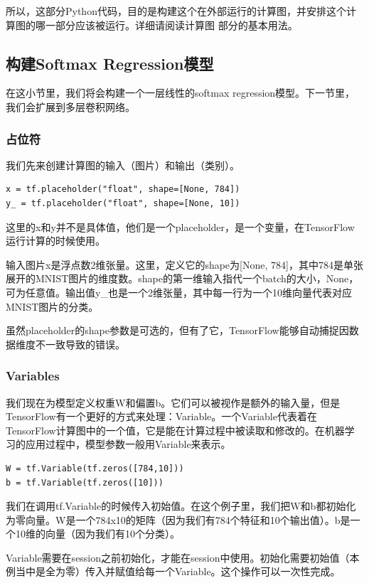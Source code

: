 \documentclass[a4paper,11pt,twoside]{ctexbook}
\begin{document}
所以，这部分Python代码，目的是构建这个在外部运行的计算图，并安排这个计算图的哪一部分应该被运行。详细请阅读计算图 部分的基本用法。 %

\subsection{构建Softmax Regression模型}

在这小节里，我们将会构建一个一层线性的softmax regression模型。下一节里，我们会扩展到多层卷积网络。

\subsubsection{占位符}
我们先来创建计算图的输入（图片）和输出（类别）。

\begin{lstlisting}
x = tf.placeholder("float", shape=[None, 784])
y_ = tf.placeholder("float", shape=[None, 10])
\end{lstlisting}

这里的x和y并不是具体值，他们是一个placeholder，是一个变量，在TensorFlow运行计算的时候使用。

输入图片x是浮点数2维张量。这里，定义它的shape为[None, 784]，其中784是单张展开的MNIST图片的维度数。shape的第一维输入指代一个batch的大小，None，可为任意值。输出值y\_也是一个2维张量，其中每一行为一个10维向量代表对应MNIST图片的分类。

虽然placeholder的shape参数是可选的，但有了它，TensorFlow能够自动捕捉因数据维度不一致导致的错误。

\subsubsection{Variables}

我们现在为模型定义权重W和偏置b。它们可以被视作是额外的输入量，但是TensorFlow有一个更好的方式来处理：Variable。一个Variable代表着在TensorFlow计算图中的一个值，它是能在计算过程中被读取和修改的。在机器学习的应用过程中，模型参数一般用Variable来表示。

\begin{lstlisting}
W = tf.Variable(tf.zeros([784,10]))
b = tf.Variable(tf.zeros([10]))
\end{lstlisting}

我们在调用tf.Variable的时候传入初始值。在这个例子里，我们把W和b都初始化为零向量。W是一个784x10的矩阵（因为我们有784个特征和10个输出值）。b是一个10维的向量（因为我们有10个分类）。

Variable需要在session之前初始化，才能在session中使用。初始化需要初始值（本例当中是全为零）传入并赋值给每一个Variable。这个操作可以一次性完成。
\end{document}
